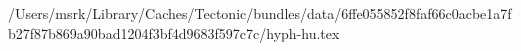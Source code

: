 /Users/msrk/Library/Caches/Tectonic/bundles/data/6ffe055852f8faf66c0acbe1a7fb27f87b869a90bad1204f3bf4d9683f597c7c/hyph-hu.tex
